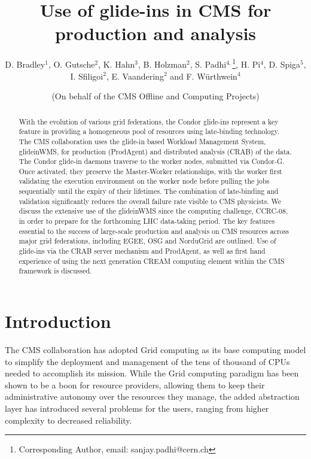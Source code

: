 \documentclass[a4paper]{jpconf}
\begin{document}
\title{Use of glide-ins in CMS for production and analysis}
\author{D. Bradley$^1$, O. Gutsche$^2$, K. Hahn$^3$, B. Holzman$^2$, S. Padhi$^{4,}$\footnote[2]{Corresponding Author, email: sanjay.padhi@cern.ch}, H. Pi$^4$, D. Spiga$^5$, I. Sfiligoi$^2$, E. Vaandering$^2$ and F. W\"urthwein$^4$}
\address{$^1$ University of Wisconsin-Madison, Madison, WI, USA}
\address{$^2$ Fermilab, Batavia, IL, USA}
\address{$^3$ Massachusetts Institute of Technology, Cambridge, MA, USA}
\address{$^4$ University of California, San Diego, La Jolla, CA, USA}
\address{$^5$ CERN, CH-1211 Geneva, Switzerland}
\author{(On behalf of the CMS Offline and Computing Projects)}
\begin{abstract}
With the evolution of various grid federations, the Condor glide-ins represent a key feature in providing a homogeneous pool of resources using late-binding technology. The CMS collaboration uses the glide-in based Workload Management System, glideinWMS, for production (ProdAgent) and distributed analysis (CRAB) of the data. The Condor glide-in daemons traverse to the worker nodes, submitted via Condor-G. Once activated, they preserve the Master-Worker relationships, with the worker first validating the execution environment on the worker node before pulling the jobs sequentially until the expiry of their lifetimes. The combination of late-binding and validation significantly reduces the overall failure rate visible to CMS physicists. We discuss the extensive use of the glideinWMS since the computing challenge, CCRC-08, in order to prepare for the forthcoming LHC data-taking period. The key features essential to the success of large-scale production and analysis on CMS resources across major grid federations, including EGEE, OSG and NorduGrid are outlined. Use of glide-ins via the CRAB server mechanism and ProdAgent, as well as first hand experience of using the next generation CREAM computing element within the CMS framework is discussed.
\end{abstract}
\section{Introduction}
The CMS collaboration has adopted Grid computing as its base computing model to simplify the deployment and management of the
tens of thousand of CPUs needed to accomplish its mission.
While the Grid computing paradigm has been shown to be a boon for resource providers, 
allowing them to keep their administrative autonomy over the resources they manage,
the added abstraction layer has introduced several problems for the users, 
ranging from higher complexity to decreased reliability.
\end{document}
